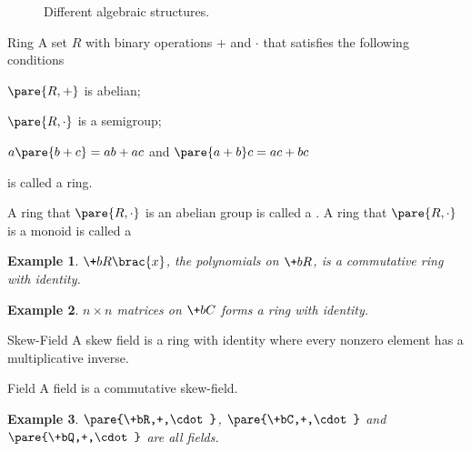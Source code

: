 \documentclass[hidelinks]{article}
\newtheorem{example}{Example}
\begin{document}
\begin{figure}[ht]
\centerline{
    }
\caption{Different algebraic structures.}
\end{figure}
\begin{termdef}{Ring}
    A set $R$ with binary operations $+$ and $\cdot$ that satisfies the following conditions
    \begin{cenum}
        \item $\pare{R,+}$ is abelian;
        \item $\pare{R,\cdot}$ is a semigroup;
        \item $a\pare{b+c} = ab+ac$ and $\pare{a+b}c = ac+bc$
    \end{cenum}
    is called a ring.
\end{termdef}
A ring that $\pare{R,\cdot}$ is an abelian group is called a . A ring that $\pare{R,\cdot}$ is a monoid is called a 
\begin{sample}
    \begin{example}
        $\+bR\brac{x}$, the polynomials on $\+bR$, is a commutative ring with identity.
    \end{example}
\end{sample}
\begin{sample}
    \begin{example}
        $n\times n$ matrices on $\+bC$ forms a ring with identity.
    \end{example}
\end{sample}
\begin{termdef}{Skew-Field}
    A skew field is a ring with identity where every nonzero element has a multiplicative inverse.
\end{termdef}
\begin{termdef}{Field}
    A field is a commutative skew-field.
\end{termdef}
\begin{sample}
    \begin{example}
        $\pare{\+bR,+,\cdot}$, $\pare{\+bC,+,\cdot}$ and $\pare{\+bQ,+,\cdot}$ are all fields.
    \end{example}
\end{sample}
\end{document}
